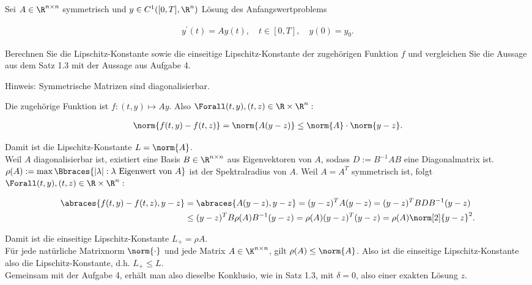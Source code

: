 \begin{exercise}

Sei $A \in \R^{n \times n}$ symmetrisch und $y \in C^1([0, T], \R^n)$ Lösung des Anfangswertproblems

\begin{align*}
  y^\prime(t) = A y(t),
  \quad
  t \in [0, T],
  \quad
  y(0) = y_0.
\end{align*}

Berechnen Sie die Lipschitz-Konstante sowie die einseitige Lipschitz-Konstante der zugehörigen Funktion $f$ und vergleichen Sie die Aussage aus dem Satz 1.3 mit der Aussage aus Aufgabe 4.

Hinweis: Symmetrische Matrizen sind diagonalisierbar.

\end{exercise}

\begin{solution}

Die zugehörige Funktion ist $f: (t, y) \mapsto Ay$.
Also $\Forall (t, y), (t, z) \in \R \times \R^n:$

\begin{align*}
  \norm{f(t, y) - f(t, z)}
  =
  \norm{A (y - z)}
  \leq
  \norm{A} \cdot \norm{y - z}.
\end{align*}

Damit ist die Lipschitz-Konstante $L = \norm{A}$. \\

Weil $A$ diagonalisierbar ist, existiert eine Basis $B \in \R^{n \times n}$ aus Eigenvektoren von $A$, sodass $D := B^{-1} A B$ eine Diagonalmatrix ist.
$\rho(A) := \max \Bbraces{|\lambda|: \lambda \text{ Eigenwert von } A}$ ist der Spektralradius von $A$.
Weil $A = A^T$ symmetrisch ist, folgt $\Forall (t, y), (t, z) \in \R \times \R^n:$

\begin{align*}
  \abraces{f(t, y) - f(t, z), y - z}
  & =
  \abraces{A (y - z), y - z}
  =
  (y - z)^T A (y - z)
  =
  (y - z)^T B D B^{-1} (y - z) \\
  & \leq
  (y - z)^T B \rho(A) B^{-1} (y - z)
  =
  \rho(A) (y - z)^T (y - z)
  =
  \rho(A) \norm[2]{y - z}^2.
\end{align*}

Damit ist die einseitige Lipschitz-Konstante $L_+ = \rho{A}$. \\

Für jede natürliche Matrixnorm $\norm{\cdot}$ und jede Matrix $A \in \K^{n \times n}$, gilt $\rho(A) \leq \norm{A}$. Also ist die einseitige Lipschitz-Konstante  also die Lipschitz-Konstante, d.h. $L_+ \leq L$. \\

Gemeinsam mit der Aufgabe 4, erhält man also dieselbe Konklusio, wie in Satz 1.3, mit $\delta = 0$, also einer exakten Lösung $z$.

\end{solution}

